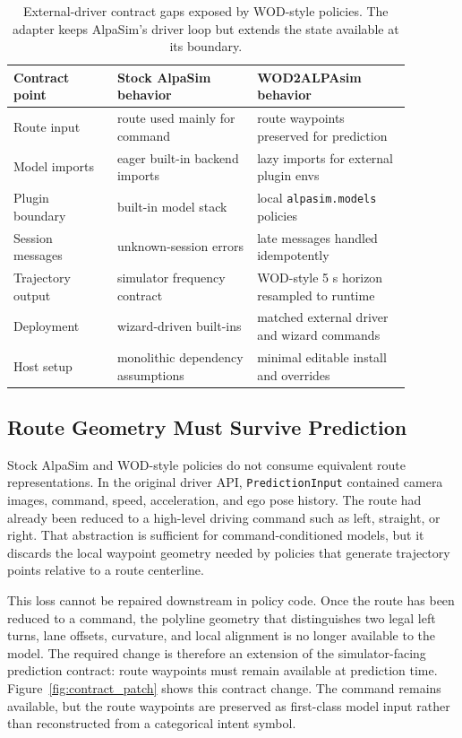 \documentclass{article}
\begin{document}
\begin{table}[t]
\centering
\small
\begin{tabular}{p{0.23\linewidth}p{0.31\linewidth}p{0.34\linewidth}}
\toprule
Contract point & Stock AlpaSim behavior & WOD2ALPAsim behavior \\
\midrule
Route input & route used mainly for command & route waypoints preserved for prediction \\
Model imports & eager built-in backend imports & lazy imports for external plugin envs \\
Plugin boundary & built-in model stack & local \texttt{alpasim.models} policies \\
Session messages & unknown-session errors & late messages handled idempotently \\
Trajectory output & simulator frequency contract & WOD-style 5 s horizon resampled to runtime \\
Deployment & wizard-driven built-ins & matched external driver and wizard commands \\
Host setup & monolithic dependency assumptions & minimal editable install and overrides \\
\bottomrule
\end{tabular}
\caption{External-driver contract gaps exposed by WOD-style policies. The adapter keeps
AlpaSim's driver loop but extends the state available at its boundary.}
\label{tab:stock_vs_adapted}
\end{table}

\subsection{Route Geometry Must Survive Prediction}

Stock AlpaSim and WOD-style policies do not consume equivalent route representations. In
the original driver API, \texttt{PredictionInput} contained camera images, command,
speed, acceleration, and ego pose history. The route had already been reduced to a
high-level driving command such as left, straight, or right. That abstraction is
sufficient for command-conditioned models, but it discards the local waypoint geometry
needed by policies that generate trajectory points relative to a route centerline.

This loss cannot be repaired downstream in policy code. Once the route
has been reduced to a command, the polyline geometry that distinguishes two legal left
turns, lane offsets, curvature, and local alignment is no longer available to the model.
The required change is therefore an extension of the simulator-facing prediction
contract: route waypoints must remain available at prediction time.
Figure~\ref{fig:contract_patch} shows this contract change. The command remains available, but
the route waypoints are preserved as first-class model input rather than reconstructed
from a categorical intent symbol.
\end{document}
